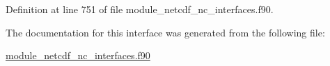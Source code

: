 Definition at line 751 of file module\+\_\+netcdf\+\_\+nc\+\_\+interfaces.\+f90.



The documentation for this interface was generated from the following file\+:\begin{DoxyCompactItemize}
\item 
\hyperlink{module__netcdf__nc__interfaces_8f90}{module\+\_\+netcdf\+\_\+nc\+\_\+interfaces.\+f90}\end{DoxyCompactItemize}
